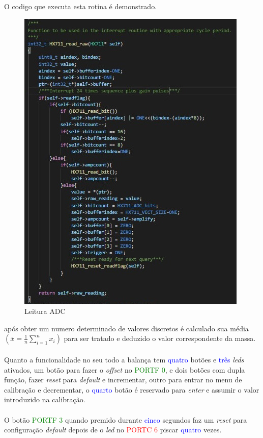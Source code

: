 \newpage
O codigo que executa esta rotina é demonstrado.
\begin{figure}[H]
	\centering
	\includegraphics[scale=0.8]{./image/PESTA/Code/read_raw.jpg}
	\caption{Leitura ADC}
	\label{read_raw}
\end{figure}
após obter um numero determinado de valores discretos é calculado sua média $\left( \overline{x}  =  \frac{1}{n}\sum_{i=1}^n x_i \right)$ para ser tratado e deduzido o valor correspondente da massa. \\
\\
Quanto a funcionalidade no seu todo a balança tem \textcolor{blue}{quatro} botões e \textcolor{blue}{três} \textit{leds} ativados, um botão para fazer o \textit{offset} no \textcolor{green}{PORTF 0}, e dois botões com dupla função, fazer \textit{reset} para \textit{default} e incrementar, outro para entrar no menu de calibração e decrementar, o \textcolor{blue}{quarto} botão é reservado para \textit{enter} e assumir o valor introduzido na calibração.\\
\\
O botão \textcolor{green}{PORTF 3} quando premido durante \textcolor{blue}{cinco} segundos faz um \textit{reset} para configuração \textit{default} depois de o \textit{led} no \textcolor{red}{PORTC 6} piscar \textcolor{blue}{quatro} vezes.\\
